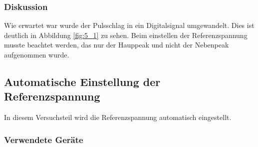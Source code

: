 \documentclass[12pt,a4paper]{article}
\begin{document}
\subsubsection*{Diskussion}

Wie erwartet war wurde der Pulsschlag in ein Digitalsignal umgewandelt. Dies ist deutlich in Abbildung \ref{fig:5_1} zu sehen. Beim einstellen der Referenzspannung musste beachtet werden, das nur der Hauppeak und nicht der Nebenpeak aufgenommen wurde.



\subsection{Automatische Einstellung der Referenzspannung}

In diesem Versuchsteil wird die Referenzspannung automatisch eingestellt.

\subsubsection*{Verwendete Geräte}
\end{document}
